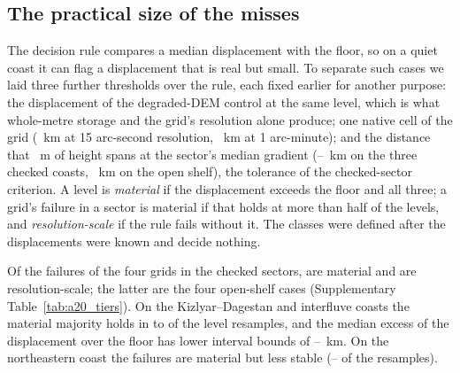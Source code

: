 \subsection*{The practical size of the misses}
The decision rule compares a median displacement with the floor, so on a quiet coast it can flag a displacement that is real but small. To separate such cases we laid three further thresholds over the rule, each fixed earlier for another purpose: the displacement of the degraded-DEM control at the same level, which is what whole-metre storage and the grid's resolution alone produce; one native cell of the grid (~km at 15 arc-second resolution, ~km at 1 arc-minute); and the distance that ~m of height spans at the sector's median gradient (--~km on the three checked coasts, ~km on the open shelf), the tolerance of the checked-sector criterion. A level is \emph{material} if the displacement exceeds the floor and all three; a grid's failure in a sector is material if that holds at more than half of the levels, and \emph{resolution-scale} if the rule fails without it. The classes were defined after the displacements were known and decide nothing.

Of the  failures of the four grids in the checked sectors,  are material and  are resolution-scale; the latter are the four open-shelf cases (Supplementary Table~\ref{tab:a20_tiers}). On the Kizlyar--Dagestan and interfluve coasts the material majority holds in  to  of the level resamples, and the median excess of the displacement over the floor has lower interval bounds of --~km. On the northeastern coast the failures are material but less stable (-- of the resamples).

